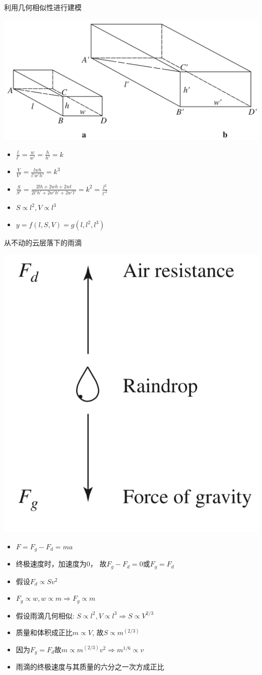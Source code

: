 \documentclass[UTF8]{ctexbeamer}
\begin{document}
\begin{frame}{利用几何相似性进行建模}
  \begin{center}
    \includegraphics[width=.4\textwidth{}]{similar.png}
  \end{center}
  \begin{itemize}
  \item $\frac{l}{l'} = \frac{w}{w'} = \frac{h}{h'} = k$
  \item $\frac{V}{V'} = \frac{lwh}{l'w'h'} = k^3$
  \item $\frac{S}{S'} = \frac{2lh+2wh+2wl}{2l'h'+2w'h'+2w'l'} = k^2 = \frac{l^2}{l'^2}$
  \item $S \propto l^2, V \propto l^3$
  \item $y = f(l, S, V) = g(l, l^2, l^3)$
  \end{itemize}

\end{frame}

\begin{frame}{从不动的云层落下的雨滴}

  \begin{center}
    \includegraphics[width=.15\textwidth{}]{rain.png}
  \end{center}

  \begin{itemize}
  \item $F = F_g - F_d = ma$
  \item 终极速度时，加速度为0， 故$F_g - F_d = 0$或$F_g = F_d$
  \item 假设$F_d \propto Sv^2$
  \item $F_g \propto w, w \propto m \Rightarrow F_g \propto m$
  \item 假设雨滴几何相似: $S \propto l^2, V \propto l^3 \Rightarrow S \propto V^{2/3}$
  \item 质量和体积成正比$m \propto V$, 故$S \propto m^(2/3)$
  \item 因为$F_g = F_d$故$m \propto m^(2/3)v^2 \Rightarrow m^{1/6} \propto v$
  \item 雨滴的终极速度与其质量的六分之一次方成正比
  \end{itemize}
\end{frame}
\end{document}

